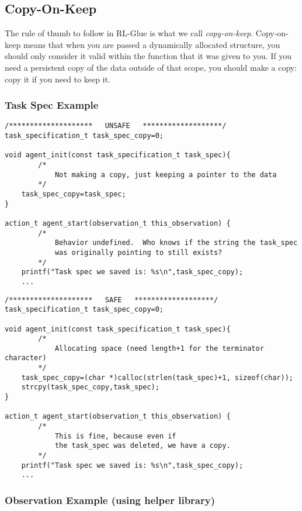 \documentclass[11pt]{article}
\begin{document}
\subsection{Copy-On-Keep}
The rule of thumb to follow in RL-Glue is what we call \textit{copy-on-keep}.  Copy-on-keep means that when you are passed a dynamically allocated structure, you should
only consider it valid within the function that it was given to you.  If you need a persistent copy of the data outside of that scope, you should make a copy: copy it if you
need to keep it.

\subsubsection{Task Spec Example}
\begin{verbatim}
/********************   UNSAFE   *******************/
task_specification_t task_spec_copy=0;
	
void agent_init(const task_specification_t task_spec){
        /*
            Not making a copy, just keeping a pointer to the data 
        */
    task_spec_copy=task_spec;
}

action_t agent_start(observation_t this_observation) {
        /*
            Behavior undefined.  Who knows if the string the task_spec
            was originally pointing to still exists?
        */
    printf("Task spec we saved is: %s\n",task_spec_copy);
    ...
\end{verbatim}

\begin{verbatim}
/********************   SAFE   *******************/
task_specification_t task_spec_copy=0;
	
void agent_init(const task_specification_t task_spec){
        /*
            Allocating space (need length+1 for the terminator character)
        */
    task_spec_copy=(char *)calloc(strlen(task_spec)+1, sizeof(char));
    strcpy(task_spec_copy,task_spec);
}

action_t agent_start(observation_t this_observation) {
        /*
            This is fine, because even if 
            the task_spec was deleted, we have a copy.
        */
    printf("Task spec we saved is: %s\n",task_spec_copy);
    ...
\end{verbatim}


\subsubsection{Observation Example (using helper library)}
\end{document}
